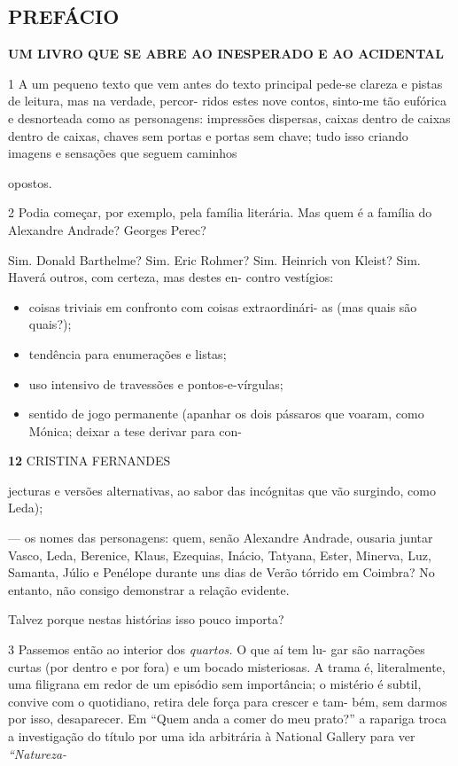 \subsection{PREFÁCIO}

\textbf{UM LIVRO QUE SE ABRE AO INESPERADO E AO ACIDENTAL}

1 A um pequeno texto que vem antes do texto principal pede-se clareza e
pistas de leitura, mas na verdade, percor- ridos estes nove contos,
sinto-me tão eufórica e desnorteada como as personagens: impressões
dispersas, caixas dentro de caixas dentro de caixas, chaves sem portas e
portas sem chave; tudo isso criando imagens e sensações que seguem
caminhos

opostos.

2 Podia começar, por exemplo, pela família literária. Mas quem é a
família do Alexandre Andrade? Georges Perec?

Sim. Donald Barthelme? Sim. Eric Rohmer? Sim. Heinrich von Kleist? Sim.
Haverá outros, com certeza, mas destes en- contro vestígios:

\begin{itemize}
\tightlist
\item
  coisas triviais em confronto com coisas extraordinári- as (mas quais
  são quais?);
\item
  tendência para enumerações e listas;
\item
  uso intensivo de travessões e pontos-e-vírgulas;
\item
  sentido de jogo permanente (apanhar os dois pássaros que voaram, como
  Mónica; deixar a tese derivar para con-
\end{itemize}

\textbf{12 }CRISTINA FERNANDES

jecturas e versões alternativas, ao sabor das incógnitas que vão
surgindo, como Leda);

--- os nomes das personagens: quem, senão Alexandre Andrade, ousaria
juntar Vasco, Leda, Berenice, Klaus, Ezequias, Inácio, Tatyana, Ester,
Minerva, Luz, Samanta, Júlio e Penélope durante uns dias de Verão
tórrido em Coimbra? No entanto, não consigo demonstrar a relação
evidente.

Talvez porque nestas histórias isso pouco importa?

3 Passemos então ao interior dos \emph{quartos. }O que aí tem lu- gar
são narrações curtas (por dentro e por fora) e um bocado misteriosas. A
trama é, literalmente, uma filigrana em redor de um episódio sem
importância; o mistério é subtil, convive com o quotidiano, retira dele
força para crescer e tam- bém, sem darmos por isso, desaparecer. Em
``Quem anda a comer do meu prato?'' a rapariga troca a investigação do
título por uma ida arbitrária à National Gallery para ver
\emph{``Natureza-}

